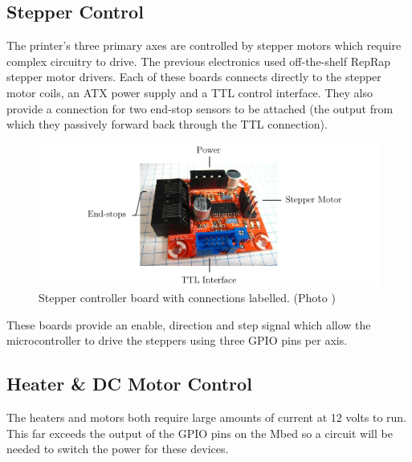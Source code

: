 		\subsection{Stepper Control}
			
			
			The printer's three primary axes are controlled by stepper motors which require
			complex circuitry to drive. The previous electronics used off-the-shelf RepRap
			stepper motor drivers\cite{stepperMotorDriver23}. Each of these boards
			connects directly to the stepper motor coils, an ATX power supply and a
			TTL control interface. They also provide a connection for two end-stop
			sensors to be attached (the output from which they passively forward back
			through the TTL connection).
			
			\begin{figure}[here]
				\includegraphics[width=1\textwidth]{diagrams/stepperControllerBoard.pdf}
				\caption{Stepper controller board with connections labelled. (Photo \cite{stepperControllerBoardPhoto})}
				\label{fig:stepperControllerBoard}
			\end{figure}
			
			These boards provide an enable, direction and step signal which allow
			the microcontroller to drive the steppers using three GPIO pins per axis.
		
		\subsection{Heater \& DC Motor Control}
			
			The heaters and motors both require large amounts of current at 12 volts
			to run. This far exceeds the output of the GPIO pins on the Mbed so a
			circuit will be needed to switch the power for these devices.
			
		
